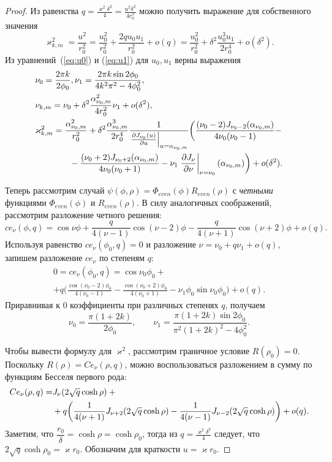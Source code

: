 \begin{proof}
Из равенства $q=\frac{\varkappa^2 \delta^2}{4}=\frac{u^2 \delta^2}{4 r_0^2}$ можно получить выражение для собственного значения
$$\varkappa_{k, m}^2 = \frac{u^2}{r_0^2} = \frac{u_0^2}{r_0^2} + \frac{2 q u_0 u_1}{r_0^2} + o(q)= \frac{u_0^2}{r_0^2} +  \delta^2 \frac{u_0^3 u_1}{2 r_0^4} + o(\delta^2).$$ 
Из уравнений~(\ref{eq:u0}) и (\ref{eq:u1}) для $u_0, u_1$ верны выражения
\begin{align}
  & \nu_0 = \frac{2\pi k}{2\phi_0}, \nu_1 = \frac{2 \pi k \sin 2 \phi_0}{4 k^2\pi^2  - 4\phi_0^2},\\
    & \nu_{k, m} = \nu_0 + \delta^2 \frac{\alpha_{\nu_0, m}^2}{4 r_0^2} \nu_1 + o(\delta^2), \\
   & \varkappa_{k, m}^2 = \frac{\alpha_{\nu_0, m}^2}{r_0^2} 
+  \delta^2 \frac{\alpha_{\nu_0, m}^3}{2 r_0^4}\frac{1}{ \left.\frac{\partial J_{\nu_0}(u)}{\partial u}\right|_{u=\alpha_{\nu_0, m}} } \biggl(
\frac{(\nu_0 - 2)J_{\nu_0-2}(\alpha_{\nu_0, m})   }{4\nu_0 (\nu_0-1)} - \notag \\
&\qquad\qquad{}- \frac{(\nu_0 + 2)J_{\nu_0+2}(\alpha_{\nu_0, m})}{4\nu_0 (\nu_0+1)} - \nu_1 \left.\frac{\partial J_\nu}{\partial \nu}\right|_{\nu = \nu_0}(\alpha_{\nu_0, m})
    \biggr) + o(\delta^2).
 \label{eq:oddSe_nueigenvalues}
 \end{align}


Теперь рассмотрим случай  $\psi(\phi, \rho) = \Phi_{even}(\phi) R_{even}(\rho)$ с \textit{четными} функциями $ \Phi_{even}(\phi) $ и $R_{even}(\rho)$. 
В силу аналогичных соображений, рассмотрим разложение четного решения:
\[
ce_\nu(\phi, q) = 	\cos{\nu\phi} + 
	\frac{q}{4(\nu-1)} \cos{(\nu-2)\phi} -\frac{q}{4(\nu+1)} \cos{(\nu+2)\phi} + o(q).
\]
Используя равенство $ce_\nu(\phi_0, q)=0$ и разложение $\nu = \nu_0 + q \nu_1 + o(q)$,
запишем разложение $ce_\nu$  по степеням $q$:
\begin{multline*}
0=ce_\nu(\phi_0, q) = 	\cos{\nu_0\phi_0}  + \\
+q \biggl(	\frac{\cos{(\nu_0-2)\phi_0}}{4(\nu_0-1)}  -\frac{\cos{(\nu_0+2)\phi_0}}{4(\nu_0+1)} - \nu_1 \phi_0 \sin \nu_0 \phi_0 \biggr) + o(q).
 \end{multline*}
Приравнивая к  $0$ коэффициенты при различных степенях  $q$, получаем
\begin{equation*}
    \nu_0 = \frac{\pi (1 + 2 k)}{2 \phi_0}, \qquad \nu_1 = \frac{\pi (1+2k) \sin 2\phi_0}{\pi^2(1+2k)^2 - 4\phi_0^2}.
\end{equation*}

Чтобы вывести формулу для  $\varkappa^2$, рассмотрим граничное условие $R(\rho_0) = 0$. 
Поскольку $R(\rho) = Ce_\nu(\rho, q)$, можно воспользоваться разложением в сумму по функциям Бесселя первого рода:
\begin{align*}
Ce_\nu(\rho, q) = & J_\nu(2\sqrt{q} \cosh{\rho}) + {}\notag \\
&{}+q \biggl( \frac{1}{4(\nu+1)} J_{\nu+2}(2\sqrt{q}\cosh{\rho}) -\frac{1}{4(\nu-1)} J_{\nu-2}(2\sqrt{q} \cosh{\rho})
\biggr) + o(q).
\end{align*}
Заметим, что $\dfrac{r_0}{\delta} = \cosh \rho = \cosh \rho_0 $, тогда из  $q = \frac{\varkappa^2 \delta^2}{4}$ следует, что $2\sqrt{q} \cosh{\rho_0} =   \varkappa r_0$. 
Обозначим для краткости $u = \varkappa r_0$. 


\end{proof}
